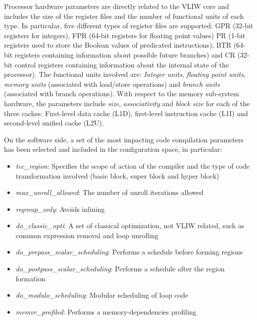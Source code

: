 Processor hardware parameters are directly related to the VLIW core and includes the size
of the register files and the number of functional
units of each type. In particular, five different types of register
files are supported:
GPR (32-bit registers for integers), FPR (64-bit registers for
floating point values) PR (1-bit registers used to store the Boolean
values of predicated instructions), BTR (64-bit registers containing
information about possible future branches) and CR (32-bit control
registers containing information about the internal state of the
processor). The functional units involved are: \emph{Integer units},
\emph{floating point units}, \emph{memory units} (associated with
load/store operations) and \emph{branch units} (associated with branch
operations). With respect to the memory sub-system hardware, the parameters
include \emph{size}, \emph{associativity} and
\emph{block size} for each of the three caches: First-level data cache
(L1D), first-level instruction cache (L1I) and second-level unified
cache (L2U).

On the software side, a set of the most impacting code
compilation parameters has been selected and included in the
configuration space, in particular:
\begin{itemize}
\item \emph{tcc\_region}: Specifies the scope of action of the compiler and the type
of code transformation involved (basic block, super block and hyper
block) 
\item \emph {max\_unroll\_allowed}: The number of unroll iterations allowed
\item \emph{regroup\_only}: Avoids inlining 
\item \emph{do\_classic\_opti}: A set of classical optimization, not VLIW related,
such as common expression removal and loop unrolling
\item \emph{do\_prepass\_scalar\_scheduling}: Performs a schedule before
forming regions 
\item \emph{do\_postpass\_scalar\_scheduling}: Performs a schedule after the region formation 
\item \emph{do\_modulo\_scheduling}: Modular scheduling of loop code
\item \emph{memvr\_profiled}: Performs a memory-dependencies profiling 
\end{itemize}

